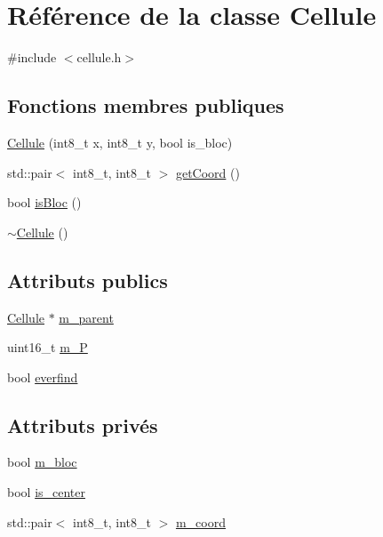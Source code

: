 \hypertarget{classCellule}{\section{Référence de la classe Cellule}
\label{classCellule}
}


{\ttfamily \#include $<$cellule.\-h$>$}

\subsection*{Fonctions membres publiques}
\begin{DoxyCompactItemize}
\item 
\hyperlink{classCellule_af506f7549ec9855560d6e6c5f2988501}{Cellule} (int8\-\_\-t x, int8\-\_\-t y, bool is\-\_\-bloc)
\item 
std\-::pair$<$ int8\-\_\-t, int8\-\_\-t $>$ \hyperlink{classCellule_a50698c84ba5a043a148a594552189427}{get\-Coord} ()
\item 
bool \hyperlink{classCellule_a4f021d3669d6688999f6299372670a60}{is\-Bloc} ()
\item 
\hyperlink{classCellule_a62c79c012c471f8dc74714c3262a696c}{$\sim$\-Cellule} ()
\end{DoxyCompactItemize}
\subsection*{Attributs publics}
\begin{DoxyCompactItemize}
\item 
\hyperlink{classCellule}{Cellule} $\ast$ \hyperlink{classCellule_a3f4117017976fde614e72d38ea10d734}{m\-\_\-parent}
\item 
uint16\-\_\-t \hyperlink{classCellule_af7cb9856701ea3e423f58b09bb7dfdbd}{m\-\_\-\-P}
\item 
bool \hyperlink{classCellule_a9c368e6fb89c5ea1e31b810207eca9ee}{everfind}
\end{DoxyCompactItemize}
\subsection*{Attributs privés}
\begin{DoxyCompactItemize}
\item 
bool \hyperlink{classCellule_adf634a9bd573a298652d70a93f3e5c6e}{m\-\_\-bloc}
\item 
bool \hyperlink{classCellule_abd3eef3d41bf99ca3a1d9edc97aa8282}{is\-\_\-center}
\item 
std\-::pair$<$ int8\-\_\-t, int8\-\_\-t $>$ \hyperlink{classCellule_a9573d226e0df26453a67fb3730794444}{m\-\_\-coord}
\end{DoxyCompactItemize}


